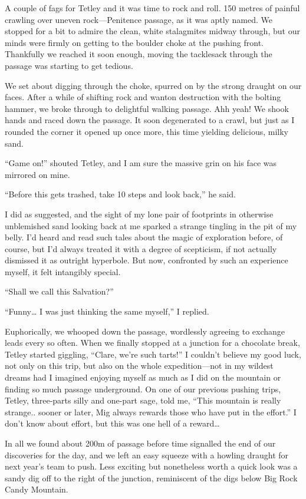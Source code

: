 A couple of fags for Tetley and it was time to rock and roll. 150 metres
of painful crawling over uneven rock---Penitence passage, as it was
aptly named. We stopped for a bit to admire the clean, white stalagmites
midway through, but our minds were firmly on getting to the boulder
choke at the pushing front. Thankfully we reached it soon enough, moving
the tacklesack through the passage was starting to get tedious.

We set about digging through the choke, spurred on by the strong draught
on our faces. After a while of shifting rock and wanton destruction with
the bolting hammer, we broke through to delightful walking passage. Ahh
yeah! We shook hands and raced down the passage. It soon degenerated to
a crawl, but just as I rounded the corner it opened up once more, this
time yielding delicious, milky sand.

``Game on!'' shouted Tetley, and I am sure the massive grin on his face
was mirrored on mine.

``Before this gets trashed, take 10 steps and look back,'' he said.

I did as suggested, and the sight of my lone pair of footprints in
otherwise unblemished sand looking back at me sparked a strange tingling
in the pit of my belly. I'd heard and read such tales about the magic of
exploration before, of course, but I'd always treated it with a degree
of scepticism, if not actually dismissed it as outright hyperbole. But
now, confronted by such an experience myself, it felt intangibly
special.

``Shall we call this Salvation?''

``Funny\ldots{} I was just thinking the same myself,'' I replied.

Euphorically, we whooped down the passage, wordlessly agreeing to
exchange leads every so often. When we finally stopped at a junction for
a chocolate break, Tetley started giggling, ``Clare, we're such tarts!''
I couldn't believe my good luck, not only on this trip, but also on the
whole expedition---not in my wildest dreams had I imagined enjoying
myself as much as I did on the mountain or finding so much passage
underground. On one of our previous pushing trips, Tetley, three-parts
silly and one-part sage, told me, ``This mountain is really strange..
sooner or later, Mig always rewards those who have put in the effort.''
I don't know about effort, but this was one hell of a reward\ldots{}

In all we found about 200m of passage before time signalled the end of
our discoveries for the day, and we left an easy squeeze with a howling
draught for next year's team to push. Less exciting but nonetheless
worth a quick look was a sandy dig off to the right of the junction,
reminiscent of the digs below Big Rock Candy Mountain.

